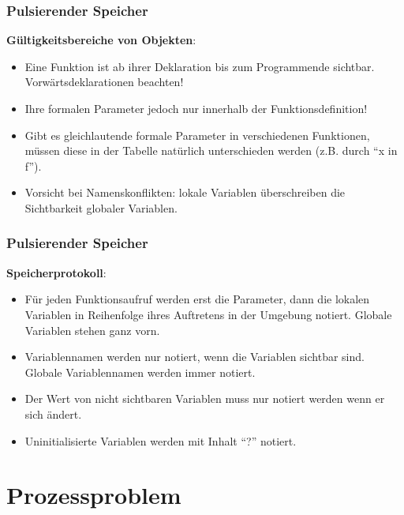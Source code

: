 \documentclass{beamer}
\begin{document}
\begin{frame} \frametitle{Pulsierender Speicher}
	\small
	\textbf{Gültigkeitsbereiche von Objekten}:
	\begin{itemize}
		\item Eine Funktion ist ab ihrer Deklaration bis zum Programmende sichtbar. Vorwärtsdeklarationen beachten!
		\item  Ihre formalen Parameter jedoch nur innerhalb der Funktionsdefinition!
		\item Gibt es gleichlautende formale Parameter in verschiedenen Funktionen, müssen diese in der Tabelle natürlich unterschieden werden (z.B. durch \enquote{x in f}).
		\item Vorsicht bei Namenskonflikten: lokale Variablen überschreiben die Sichtbarkeit globaler Variablen.
	\end{itemize}
\end{frame}

\begin{frame} \frametitle{Pulsierender Speicher}
	\small
	\textbf{Speicherprotokoll}:
	\begin{itemize}
		\item Für jeden Funktionsaufruf werden erst die Parameter, dann die lokalen Variablen in Reihenfolge ihres Auftretens in der Umgebung notiert. Globale Variablen stehen ganz vorn.
		\item Variablennamen werden nur notiert, wenn die Variablen sichtbar sind. Globale Variablennamen werden immer notiert.
		\item Der Wert von nicht sichtbaren Variablen muss nur notiert werden wenn er sich ändert.
		\item Uninitialisierte Variablen werden mit Inhalt \enquote{?} notiert.
	\end{itemize}
\end{frame}

\section{Prozessproblem}
\end{document}
